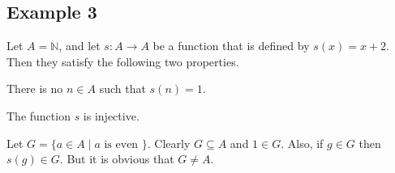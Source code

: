 \subsection*{Example 3}
Let $A = \mathbb{N}$, and let $s: A \to A$ be a function that is defined by $s(x) = x + 2$. Then they satisfy the following two properties.
\begin{lenumerate}
	\item There is no $n \in A$ such that $s(n) = 1$.
	\item The function $s$ is injective.
\end{lenumerate}
Let $G = \{ a \in A \mid  a \text{ is even } \}$. Clearly $G \subseteq A$ and $1 \in G$. Also, if $g \in G$ then $s(g) \in G$. But it is obvious that $G \not= A$.

